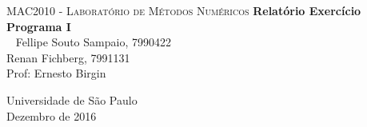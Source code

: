 \thispagestyle{empty}
\begin{center}
    \textsc
    {
        \LARGE{MAC2010 - Laboratório de Métodos Numéricos}
    }
    \vskip 3cm
    \vspace*{2.3cm}
    \textbf{\LARGE{Relatório Exercício Programa I}}\\\
    \vskip 3.5cm
    \Large{
        Fellipe Souto Sampaio, 7990422 \\ 
        Renan Fichberg, 7991131 \\
        Prof: Ernesto Birgin}
    

    \vskip 3.0cm
    \normalsize{Universidade de São Paulo \\ Dezembro de 2016}
\end{center}